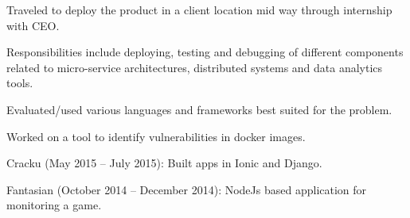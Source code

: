 \documentclass[letterpaper]{deedy-resume} %
\begin{document}
\begin{minipage}[t]{0.66\textwidth}

\begin{tightitemize}
\item Traveled to deploy the product in a client location mid way through internship with CEO.
\item Responsibilities include deploying, testing and debugging of different components related to micro-service architectures, distributed systems and data analytics tools.
\item Evaluated/used various languages and frameworks best suited for the problem.
\item Worked on a tool to identify vulnerabilities in docker images.
\end{tightitemize}

\sectionspace %


\begin{tightitemize}
\item Cracku (May 2015 – July 2015): Built apps in Ionic and Django.
\item Fantasian (October 2014 – December 2014): NodeJs based application for monitoring a game.
\end{tightitemize}

\vspace{\topsep} %

\end{minipage}
\end{document}
